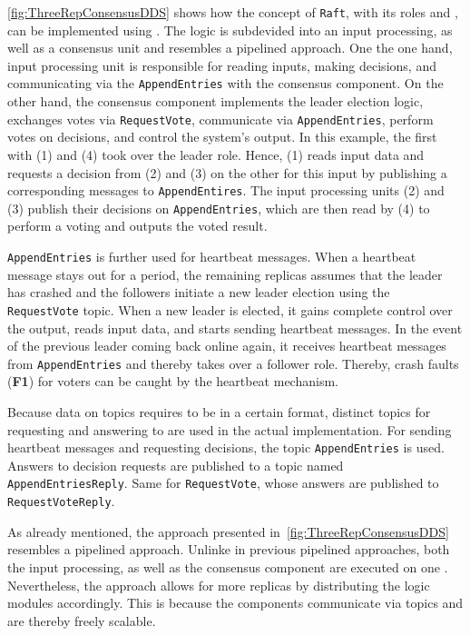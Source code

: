 \autoref{fig:ThreeRepConsensusDDS} shows how the concept of \texttt{Raft}, with its roles and , can be implemented using .
The logic is subdevided into an input processing, as well as a consensus unit and resembles a pipelined approach.
One the one hand, input processing unit is responsible for reading inputs, making decisions, and communicating via the \texttt{AppendEntries}  with the consensus component.
On the other hand, the consensus component implements the leader election logic, exchanges votes via \texttt{RequestVote}, communicate via \texttt{AppendEntries}, perform votes on decisions, and control the system's output.
In this example, the first  with (1) and (4) took over the leader role.
Hence, (1) reads input data and requests a decision from (2) and (3) on the other  for this input by publishing a corresponding messages to \texttt{AppendEntires}.
The input processing units (2) and (3) publish their decisions on \texttt{AppendEntries}, which are then read by (4) to perform a voting and outputs the voted result.

\texttt{AppendEntries} is further used for heartbeat messages.
When a heartbeat message stays out for a period, the remaining replicas assumes that the leader has crashed and the followers initiate a new leader election using the \texttt{RequestVote} topic.
When a new leader is elected, it gains complete control over the output, reads input data, and starts sending heartbeat messages.
In the event of the previous leader coming back online again, it receives heartbeat messages from \texttt{AppendEntries} and thereby takes over a follower role.
Thereby, crash faults (\textbf{F1}) for voters can be caught by the heartbeat mechanism.

Because data on  topics requires to be in a certain format, distinct topics for requesting and answering to  are used in the actual implementation.
For sending heartbeat messages and requesting decisions, the topic \texttt{AppendEntries} is used.
Answers to decision requests are published to a topic named \texttt{AppendEntriesReply}.
Same for \texttt{RequestVote}, whose answers are published to \texttt{RequestVoteReply}.

As already mentioned, the approach presented in~\autoref{fig:ThreeRepConsensusDDS} resembles a pipelined approach.
Unlinke in previous pipelined approaches, both the input processing, as well as the consensus component are executed on one .
Nevertheless, the approach allows for more replicas by distributing the logic modules accordingly.
This is because the components communicate via  topics and are thereby freely scalable.
\\

